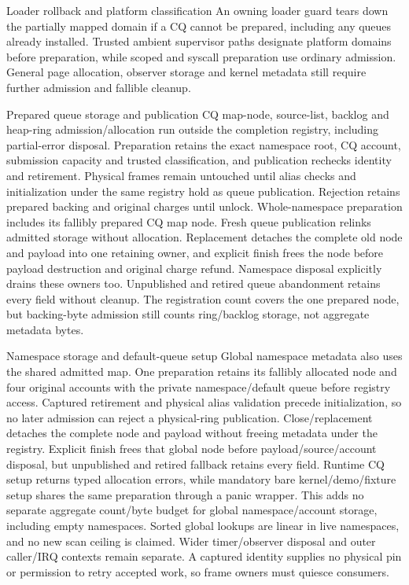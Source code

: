 \begin{implementationdetail}{Loader rollback and platform classification}
An owning loader guard tears down the partially mapped domain if a CQ cannot
be prepared, including any queues already installed. Trusted ambient supervisor
paths designate platform domains before preparation, while scoped and syscall
preparation use ordinary admission. General page allocation, observer storage
and kernel metadata still require further admission and fallible cleanup.
\end{implementationdetail}

\begin{implementationdetail}{Prepared queue storage and publication}
CQ map-node, source-list, backlog and heap-ring admission/allocation run outside the
completion registry, including partial-error disposal. Preparation retains the
exact namespace root, CQ account, submission capacity and trusted classification, and
publication rechecks identity and retirement. Physical frames remain untouched
until alias checks and initialization under the same registry hold as queue
publication. Rejection retains prepared backing and original charges until
unlock. Whole-namespace preparation includes its fallibly prepared CQ map node.
Fresh queue publication relinks admitted storage without allocation. Replacement
detaches the complete old node and payload into one retaining owner, and explicit
finish frees the node before payload destruction and original charge refund.
Namespace disposal explicitly drains these owners too. Unpublished and retired
queue abandonment retains every field without cleanup. The registration count
covers the one prepared node, but backing-byte admission still counts ring/backlog
storage, not aggregate metadata bytes.
\end{implementationdetail}

\begin{implementationdetail}{Namespace storage and default-queue setup}
Global namespace metadata also uses the shared admitted map. One preparation
retains its fallibly allocated node and four original accounts with the private
namespace/default queue before registry access. Captured retirement and physical
alias validation precede initialization, so no later admission can reject a
physical-ring publication. Close/replacement detaches the complete node and
payload without freeing metadata under the registry. Explicit finish frees that
global node before payload/source/account disposal, but unpublished and retired
fallback retains every field. Runtime CQ setup returns typed allocation errors, while
mandatory bare kernel/demo/fixture setup shares the same preparation through
a panic wrapper. This adds no separate aggregate count/byte budget for global
namespace/account storage, including empty namespaces. Sorted global lookups
are linear in live namespaces, and no new scan ceiling is claimed. Wider
timer/observer disposal and outer caller/IRQ contexts remain separate.
A captured identity supplies no physical
pin or permission to retry accepted work, so frame owners must quiesce consumers.
\end{implementationdetail}

